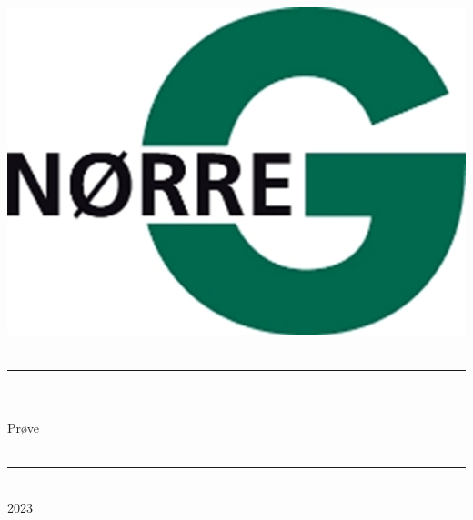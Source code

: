 \documentclass[12pt,x11names,a4paper]{article}
\begin{document}
%

\begin{titlepage}

\begin{minipage}{0.27\textwidth}

\end{minipage}
\begin{minipage}{0.73\textwidth}
\begin{center}
\phantom{h} \vspace{1cm}\\
\hspace{4cm}
\includegraphics[scale = 1]{Billeder/Norreg.png} \\
\phantom{h} \vspace{5cm}\\
\rule{0.7\textwidth}{0.3mm}\\
\phantom{h}\\
{\fontsize{50}{60}\selectfont Prøve}\\
\phantom{h}\\
\rule{0.7\textwidth}{0.3mm}\\
\Large 2023\\


\end{center}
\end{minipage}
\end{titlepage}
\end{document}
